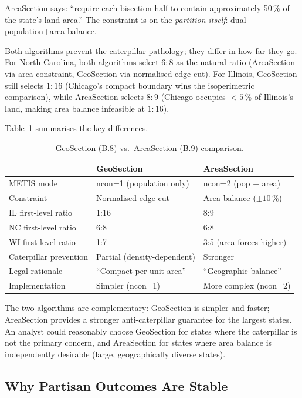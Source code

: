 AreaSection says: ``require each bisection half to contain approximately
50\,\% of the state's land area.''
The constraint is on the \emph{partition itself}: dual population+area balance.

Both algorithms prevent the caterpillar pathology; they differ in how far
they go.
For North Carolina, both algorithms select $6:8$ as the natural ratio
(AreaSection via area constraint, GeoSection via normalised edge-cut).
For Illinois, GeoSection still selects $1:16$ (Chicago's compact boundary
wins the isoperimetric comparison), while AreaSection selects $8:9$
(Chicago occupies $<5$\,\% of Illinois's land, making area balance infeasible
at $1:16$).

Table~\ref{tab:geosection-vs-areasection} summarises the key differences.

\begin{table}[h]
\centering
\caption{GeoSection (B.8) vs.\ AreaSection (B.9) comparison.}
\label{tab:geosection-vs-areasection}
\begin{tabular}{lll}
\toprule
& GeoSection & AreaSection \\
\midrule
METIS mode & ncon=1 (population only) & ncon=2 (pop + area) \\
Constraint & Normalised edge-cut & Area balance ($\pm 10$\,\%) \\
IL first-level ratio & 1:16 & 8:9 \\
NC first-level ratio & 6:8 & 6:8 \\
WI first-level ratio & 1:7 & 3:5 (area forces higher) \\
Caterpillar prevention & Partial (density-dependent) & Stronger \\
Legal rationale & ``Compact per unit area'' & ``Geographic balance'' \\
Implementation & Simpler (ncon=1) & More complex (ncon=2) \\
\bottomrule
\end{tabular}
\end{table}

The two algorithms are complementary: GeoSection is simpler and faster;
AreaSection provides a stronger anti-caterpillar guarantee for the largest
states.
An analyst could reasonably choose GeoSection for states where the caterpillar
is not the primary concern, and AreaSection for states where area balance
is independently desirable (large, geographically diverse states).

\subsection{Why Partisan Outcomes Are Stable}
\label{sec:stability}

